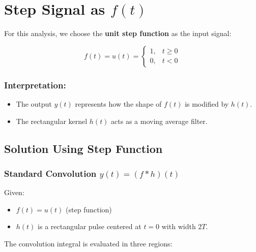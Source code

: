 \section{Step Signal as $f(t)$}
For this analysis, we choose the \textbf{unit step function} as the input signal:

\begin{equation}
f(t) = u(t) = 
\begin{cases} 
1, & t \geq 0 \\
0, & t < 0 
\end{cases}
\end{equation}

\subsubsection{Interpretation:}
\begin{itemize}
    \item The output \( y(t) \) represents how the shape of \( f(t) \) is modified by \( h(t) \).
    \item The rectangular kernel \( h(t) \) acts as a moving average filter.
\end{itemize}

\subsection{Solution Using Step Function}

\subsubsection{Standard Convolution \( y(t) = (f * h)(t) \)}

Given:
\begin{itemize}
    \item \( f(t) = u(t) \) (step function)
    \item \( h(t) \) is a rectangular pulse centered at \( t = 0 \) with width \( 2T \).
\end{itemize}

The convolution integral is evaluated in three regions:

